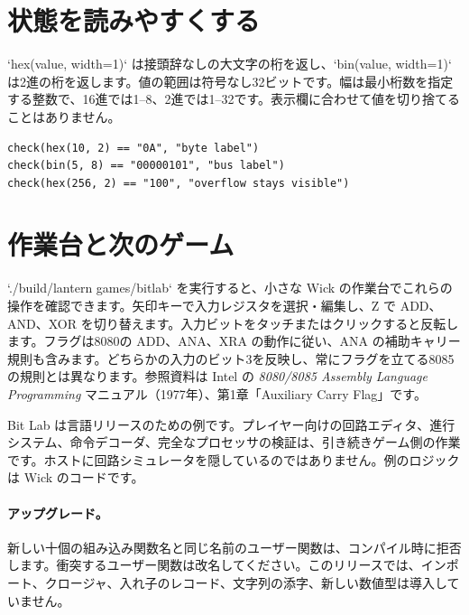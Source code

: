\section{状態を読みやすくする}

`hex(value, width=1)` は接頭辞なしの大文字の桁を返し、`bin(value, width=1)` は2進の桁を返します。値の範囲は符号なし32ビットです。幅は最小桁数を指定する整数で、16進では1--8、2進では1--32です。表示欄に合わせて値を切り捨てることはありません。

\begin{lstlisting}[language=wick]
check(hex(10, 2) == "0A", "byte label")
check(bin(5, 8) == "00000101", "bus label")
check(hex(256, 2) == "100", "overflow stays visible")
\end{lstlisting}

\section{作業台と次のゲーム}

`./build/lantern games/bitlab` を実行すると、小さな Wick の作業台でこれらの操作を確認できます。矢印キーで入力レジスタを選択・編集し、Z で ADD、AND、XOR を切り替えます。入力ビットをタッチまたはクリックすると反転します。フラグは8080の ADD、ANA、XRA の動作に従い、ANA の補助キャリー規則も含みます。どちらかの入力のビット3を反映し、常にフラグを立てる8085の規則とは異なります。参照資料は Intel の \emph{8080/8085 Assembly Language Programming} マニュアル（1977年）、第1章「Auxiliary Carry Flag」です。

Bit Lab は言語リリースのための例です。プレイヤー向けの回路エディタ、進行システム、命令デコーダ、完全なプロセッサの検証は、引き続きゲーム側の作業です。ホストに回路シミュレータを隠しているのではありません。例のロジックは Wick のコードです。

\paragraph{アップグレード。} 新しい十個の組み込み関数名と同じ名前のユーザー関数は、コンパイル時に拒否します。衝突するユーザー関数は改名してください。このリリースでは、インポート、クロージャ、入れ子のレコード、文字列の添字、新しい数値型は導入していません。
